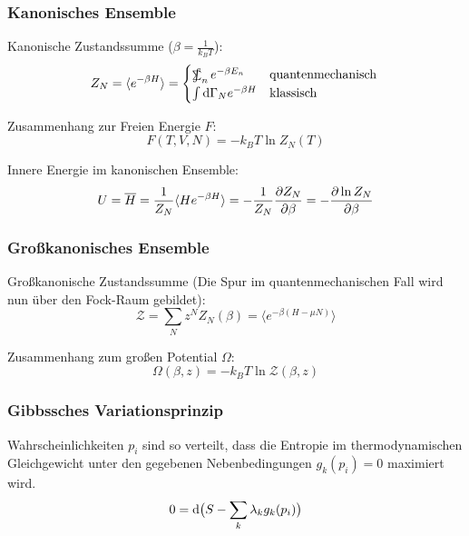 \documentclass[11pt]{article}
\DeclareMathOperator*{\SumInt}{%
\mathchoice%
  {\ooalign{$\displaystyle\sum$\cr\hidewidth$\displaystyle\int$\hidewidth\cr}}
  {\ooalign{\raisebox{.14\height}{\scalebox{.7}{$\textstyle\sum$}}\cr\hidewidth$\textstyle\int$\hidewidth\cr}}
  {\ooalign{\raisebox{.2\height}{\scalebox{.6}{$\scriptstyle\sum$}}\cr$\scriptstyle\int$\cr}}
  {\ooalign{\raisebox{.2\height}{\scalebox{.6}{$\scriptstyle\sum$}}\cr$\scriptstyle\int$\cr}}
}
\numberwithin{equation}{section}
\begin{document}
			\subsubsection{Kanonisches Ensemble}
				\noindent
				Kanonische Zustandssumme ($\beta = \frac{1}{k_B T}$):
				\begin{equation}
					Z_N=\langle e^{-\beta H} \rangle
						= \begin{cases}
								\SumInt_n e^{-\beta E_n} & \text{quantenmechanisch} \\
								\int \diff \Gamma_N e^{-\beta H} & \text{klassisch}
							\end{cases} \\
				\end{equation}

				\noindent
				Zusammenhang zur Freien Energie $F$:
				\begin{equation}
					F(T, V, N) = -k_B T \ln{Z_N(T)}
				\end{equation}


				\noindent
				Innere Energie im kanonischen Ensemble:
				\begin{equation}
					U = \overline{H} = \frac{1}{Z_N}\langle He^{-\beta H}\rangle = -\frac{1}{Z_N}\frac{\partial Z_N}{\partial \beta} = -\frac{\partial \ln Z_N}{\partial \beta}
				\end{equation}

			\subsubsection{Großkanonisches Ensemble}
				\noindent
				Großkanonische Zustandssumme (Die Spur im quantenmechanischen Fall wird nun über den Fock-Raum gebildet):
				\begin{equation}
					\mathcal{Z} = \sum_N z^N Z_N(\beta) = \langle e^{-\beta(H-\mu N)} \rangle
				\end{equation}

				\noindent
				Zusammenhang zum großen Potential $\Omega$:
				\begin{equation}
					\Omega(\beta,z) = -k_B T \ln \mathcal{Z}(\beta,z)
				\end{equation}


			\subsubsection{Gibbssches Variationsprinzip}
				\noindent
				Wahrscheinlichkeiten $p_i$ sind so verteilt, dass die Entropie im thermodynamischen Gleichgewicht unter den gegebenen Nebenbedingungen $g_k(p_i) = 0$ maximiert wird.
				\begin{equation}
					0 = \mathrm{d} \big( S - \sum_k \lambda_k g_k(p_i) \big)
				\end{equation}
\end{document}

